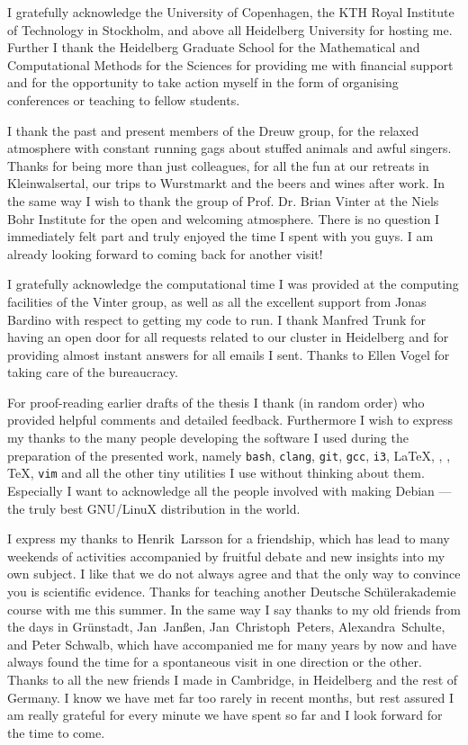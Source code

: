 
I gratefully acknowledge
the University of Copenhagen, the
KTH Royal Institute of Technology in Stockholm,
and above all Heidelberg University for hosting me.
Further I thank the Heidelberg Graduate School
for the Mathematical and Computational Methods for the Sciences
for providing me with financial support
and for the opportunity to take action myself
in the form of organising conferences or teaching to fellow students.

I thank the past and present members of the Dreuw group,
for the relaxed atmosphere
with constant running gags about
stuffed animals and awful singers.
Thanks for being more than just colleagues,
for all the fun
at our retreats in Kleinwalsertal, our trips to Wurstmarkt and
the beers and wines after work.
In the same way I wish to thank
the group of Prof. Dr. Brian Vinter at the Niels Bohr Institute
for the open and welcoming atmosphere.
There is no question I immediately felt part
and truly enjoyed the time I spent with you guys.
I am already looking forward to coming back for another visit!

I gratefully acknowledge the computational time I was provided
at the computing facilities of the Vinter group,
as well as all the excellent support from Jonas Bardino
with respect to getting my code to run.
I thank Manfred Trunk
for having an open door for all requests related
to our cluster in Heidelberg
and for providing almost instant answers for all emails I sent.
Thanks to Ellen Vogel for taking care of the bureaucracy.


For proof-reading earlier drafts of the thesis I thank
(in random order)
%
who provided helpful comments and detailed feedback.
Furthermore I wish to express my thanks to the many people developing
the software I used during the preparation of the presented work,
namely
\texttt{bash},
\texttt{clang},
\texttt{git},
\texttt{gcc},
\texttt{i3},
\LaTeX,
\numpy,
\python,
\TeX,
\texttt{vim}
and all the other tiny utilities I use without thinking about them.
Especially I want to acknowledge all the people
involved with making Debian --- the truly best
GNU/LinuX distribution in the world.


I express my thanks to Henrik~Larsson for a friendship,
which has lead to many weekends of activities accompanied
by fruitful debate and new insights into my own subject.
I like that we do not always agree
and that the only way to convince you is scientific evidence.
Thanks for teaching another Deutsche Schülerakademie course with me this summer.
In the same way I say thanks to my old friends
from the days in Grünstadt,
Jan~Janßen,
Jan~Christoph~Peters,
Alexandra~Schulte,
and
Peter Schwalb,
which have accompanied me for many years by now
and have always found the time for a spontaneous visit
in one direction or the other.
Thanks to all the new friends I made in Cambridge,
in Heidelberg and the rest of Germany.
I know we have met far too rarely in recent months,
but rest assured I am really
grateful for every minute we have spent so far
and I look forward for the time to come.

